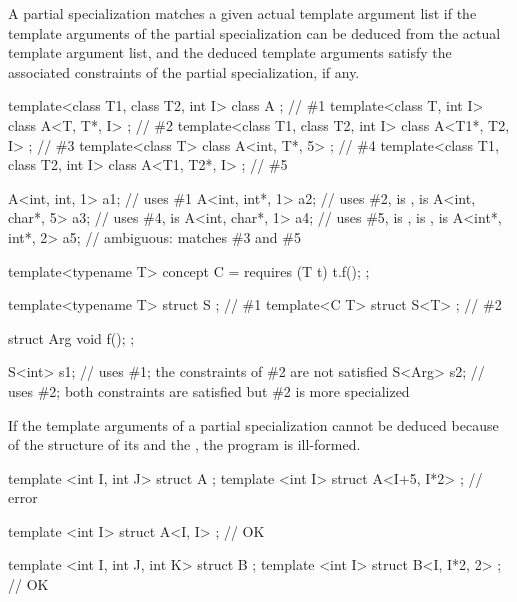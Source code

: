 \pnum
A partial specialization matches a given actual template argument
list if the template arguments of the partial specialization can be
deduced from the actual template argument list,
and the deduced template arguments satisfy the associated constraints
of the partial specialization, if any.
\begin{example}
\begin{codeblock}
template<class T1, class T2, int I> class A             { };    // \#1
template<class T, int I>            class A<T, T*, I>   { };    // \#2
template<class T1, class T2, int I> class A<T1*, T2, I> { };    // \#3
template<class T>                   class A<int, T*, 5> { };    // \#4
template<class T1, class T2, int I> class A<T1, T2*, I> { };    // \#5

A<int, int, 1>   a1;                    // uses \#1
A<int, int*, 1>  a2;                    // uses \#2,  is ,  is 
A<int, char*, 5> a3;                    // uses \#4,  is 
A<int, char*, 1> a4;                    // uses \#5,  is ,  is ,  is 
A<int*, int*, 2> a5;                    // ambiguous: matches \#3 and \#5
\end{codeblock}
\end{example}
\begin{example}
\begin{codeblock}
template<typename T> concept C = requires (T t) { t.f(); };

template<typename T> struct S { };      // \#1
template<C T> struct S<T> { };          // \#2

struct Arg { void f(); };

S<int> s1;                              // uses \#1; the constraints of \#2 are not satisfied
S<Arg> s2;                              // uses \#2; both constraints are satisfied but \#2 is more specialized
\end{codeblock}
\end{example}

\pnum
If the template arguments of a partial specialization cannot be deduced
because of the structure of its 
and the ,
the program is ill-formed.
\begin{example}
\begin{codeblock}
template <int I, int J> struct A {};
template <int I> struct A<I+5, I*2> {};     // error

template <int I> struct A<I, I> {};         // OK

template <int I, int J, int K> struct B {};
template <int I> struct B<I, I*2, 2> {};    // OK
\end{codeblock}
\end{example}

